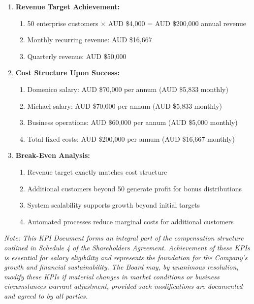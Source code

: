 \begin{enumerate}[label=\arabic*.]
\item \textbf{Revenue Target Achievement:}
    \begin{enumerate}[label=(\alph*)]
    \item 50 enterprise customers × AUD \$4,000 = AUD \$200,000 annual revenue
    \item Monthly recurring revenue: AUD \$16,667
    \item Quarterly revenue: AUD \$50,000
    \end{enumerate}

\item \textbf{Cost Structure Upon Success:}
    \begin{enumerate}[label=(\alph*)]
    \item Domenico salary: AUD \$70,000 per annum (AUD \$5,833 monthly)
    \item Michael salary: AUD \$70,000 per annum (AUD \$5,833 monthly)
    \item Business operations: AUD \$60,000 per annum (AUD \$5,000 monthly)
    \item Total fixed costs: AUD \$200,000 per annum (AUD \$16,667 monthly)
    \end{enumerate}

\item \textbf{Break-Even Analysis:}
    \begin{enumerate}[label=(\alph*)]
    \item Revenue target exactly matches cost structure
    \item Additional customers beyond 50 generate profit for bonus distributions
    \item System scalability supports growth beyond initial targets
    \item Automated processes reduce marginal costs for additional customers
    \end{enumerate}
\end{enumerate}

\textit{Note: This KPI Document forms an integral part of the compensation structure outlined in Schedule 4 of the Shareholders Agreement. Achievement of these KPIs is essential for salary eligibility and represents the foundation for the Company's growth and financial sustainability. The Board may, by unanimous resolution, modify these KPIs if material changes in market conditions or business circumstances warrant adjustment, provided such modifications are documented and agreed to by all parties.} 